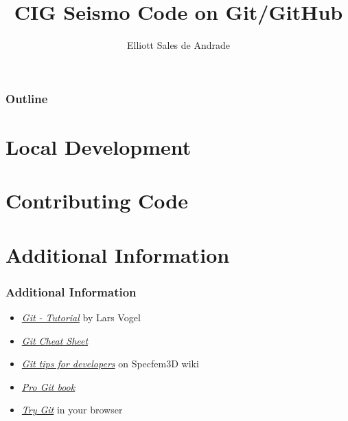 \documentclass{beamer}
\author{Elliott Sales de Andrade}
\title{CIG Seismo Code on Git/GitHub}
\institute{University of Toronto}
\begin{document}
\begin{frame}
 \titlepage
\end{frame}

\begin{frame}
 \frametitle{Outline}
 \tableofcontents
\end{frame}





\section{Local Development}

\section{Contributing Code}

\section{Additional Information}

\begin{frame}
 \frametitle{Additional Information}

 \begin{itemize}
  \item \href{http://www.vogella.com/tutorials/Git/article.html}{\textit{Git - Tutorial}}
   by Lars Vogel
  \item \href{http://www.git-tower.com/blog/git-cheat-sheet/}{\textit{Git Cheat Sheet}}
  \item \href{https://github.com/geodynamics/specfem3d/wiki/Git-tips-for-developers}{\textit{Git tips for developers}}
   on Specfem3D wiki
  \item \href{http://git-scm.com/book}{\textit{Pro Git book}}
  \item \href{https://try.github.io/levels/1/challenges/1}{\textit{Try Git}}
   in your browser
 \end{itemize}
\end{frame}
\end{document}

